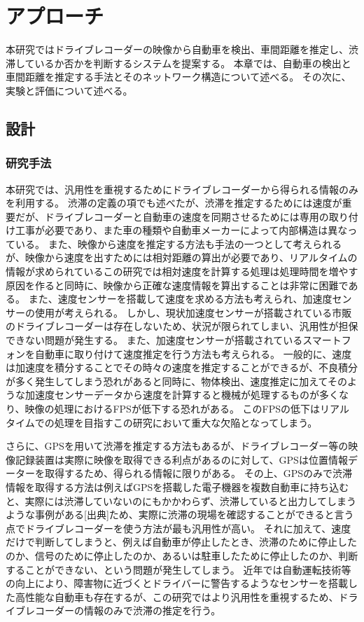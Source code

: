\chapter{アプローチ}
本研究ではドライブレコーダーの映像から自動車を検出、車間距離を推定し、渋滞しているか否かを判断するシステムを提案する。
本章では、自動車の検出と車間距離を推定する手法とそのネットワーク構造について述べる。
その次に、実験と評価について述べる。

\newpage
\section{設計}
\subsection{研究手法}
本研究では、汎用性を重視するためにドライブレコーダーから得られる情報のみを利用する。
渋滞の定義の項でも述べたが、渋滞を推定するためには速度が重要だが、ドライブレコーダーと自動車の速度を同期させるためには専用の取り付け工事が必要であり、また車の種類や自動車メーカーによって内部構造は異なっている。
また、映像から速度を推定する方法も手法の一つとして考えられるが、映像から速度を出すためには相対距離の算出が必要であり、リアルタイムの情報が求められているこの研究では相対速度を計算する処理は処理時間を増やす原因を作ると同時に、映像から正確な速度情報を算出することは非常に困難である。
また、速度センサーを搭載して速度を求める方法も考えられ、加速度センサーの使用が考えられる。
しかし、現状加速度センサーが搭載されている市販のドライブレコーダーは存在しないため、状況が限られてしまい、汎用性が担保できない問題が発生する。
また、加速度センサーが搭載されているスマートフォンを自動車に取り付けて速度推定を行う方法も考えられる。
一般的に、速度は加速度を積分することでその時々の速度を推定することができるが、不良積分が多く発生してしまう恐れがあると同時に、物体検出、速度推定に加えてそのような加速度センサーデータから速度を計算すると機械が処理するものが多くなり、映像の処理におけるFPSが低下する恐れがある。
このFPSの低下はリアルタイムでの処理を目指すこの研究において重大な欠陥となってしまう。

さらに、GPSを用いて渋滞を推定する方法もあるが、ドライブレコーダー等の映像記録装置は実際に映像を取得できる利点があるのに対して、GPSは位置情報データーを取得するため、得られる情報に限りがある。
その上、GPSのみで渋滞情報を取得する方法は例えばGPSを搭載した電子機器を複数自動車に持ち込むと、実際には渋滞していないのにもかかわらず、渋滞していると出力してしまうような事例がある[出典]ため、実際に渋滞の現場を確認することができると言う点でドライブレコーダーを使う方法が最も汎用性が高い。
それに加えて、速度だけで判断してしまうと、例えば自動車が停止したとき、渋滞のために停止したのか、信号のために停止したのか、あるいは駐車したために停止したのか、判断することができない、という問題が発生してしまう。
近年では自動運転技術等の向上により、障害物に近づくとドライバーに警告するようなセンサーを搭載した高性能な自動車も存在するが、この研究ではより汎用性を重視するため、ドライブレコーダーの情報のみで渋滞の推定を行う。

